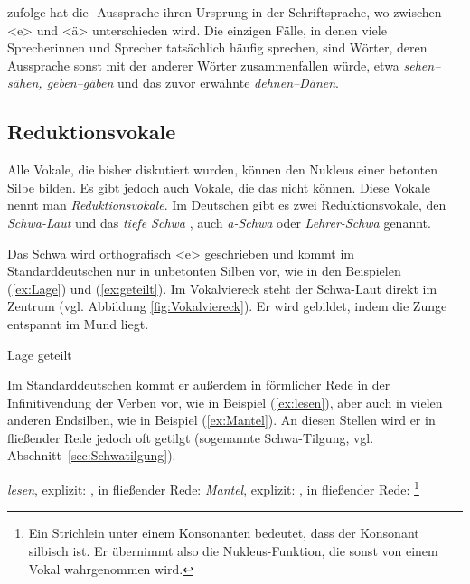 \citet[14--15 und Quellen darin]{Becker1998} zufolge hat die \textipa{[E:]}-Aussprache ihren Ursprung in der Schriftsprache, wo zwischen <e> und <ä> unterschieden wird. Die einzigen Fälle, in denen viele Sprecherinnen und Sprecher tatsächlich häufig \textipa{[E:]} sprechen, sind Wörter, deren Aussprache sonst mit der anderer Wörter zusammenfallen würde, etwa \textit{sehen--sähen, geben--gäben} und das zuvor erwähnte \textit{dehnen--Dänen}.


\subsection{Reduktionsvokale}\label{subsection:Reduktionsvokale}

Alle Vokale, die bisher diskutiert wurden, können den Nukleus einer betonten Silbe bilden. Es gibt jedoch auch Vokale, die das nicht können. Diese Vokale nennt man \textit{Reduktionsvokale}. Im Deutschen gibt es zwei Reduktionsvokale, den \textit{Schwa-Laut} \textipa{[@]} und das \textit{tiefe Schwa} \textipa{[5]}, auch \textit{a-Schwa} oder \textit{Lehrer-Schwa} genannt. 

Das Schwa  \textipa{[@]} wird orthografisch <e> geschrieben und kommt im Standarddeutschen nur in unbetonten Silben vor, wie in den Beispielen (\ref{ex:Lage}) und (\ref{ex:geteilt}). Im Vokalviereck steht der Schwa-Laut direkt im Zentrum (vgl. Abbildung \ref{fig:Vokalviereck}). Er wird gebildet, indem die Zunge entspannt im Mund liegt.

\ea
\ea \label{ex:Lage} Lage \textipa{[\textprimstress la:.g@]}
\ex \label{ex:geteilt} geteilt \textipa{[g@\textprimstress t\t*{aI}lt]}
\z 
\z

Im Standarddeutschen kommt er außerdem in förmlicher Rede in der Infinitivendung der Verben vor, wie in Beispiel (\ref{ex:lesen}), aber auch in vielen anderen Endsilben, wie in Beispiel (\ref{ex:Mantel}). An diesen Stellen wird er in fließender Rede jedoch oft getilgt (sogenannte Schwa-Tilgung, vgl. Abschnitt~\ref{sec:Schwatilgung}).

\ea
\ea \label{ex:lesen} \textit{lesen}, explizit: \textipa{[\textprimstress le:.z@n]}, in fließender Rede: \textipa{[\textprimstress le:.z\s{n}]}
\ex \label{ex:Mantel} \textit{Mantel}, explizit: , in fließender Rede: \footnote{Ein Strichlein unter einem Konsonanten bedeutet, dass der Konsonant silbisch ist. Er übernimmt also die Nukleus-Funktion, die sonst von einem Vokal wahrgenommen wird.}
\z 
\z


